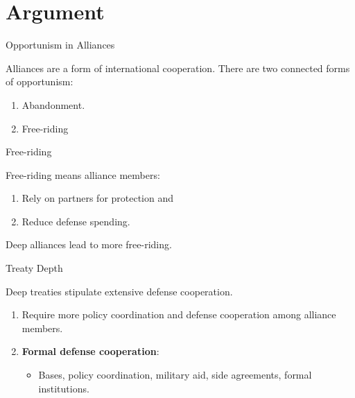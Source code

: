 \documentclass[12pt]{beamer}
\begin{document}

\section{Argument}



\begin{frame}{Opportunism in Alliances}

Alliances are a form of international cooperation. There are two connected forms of opportunism: 
\begin{enumerate} 
\pause
\item Abandonment.   
\pause
\item Free-riding
\end{enumerate}  

\end{frame}


\begin{frame}{Free-riding}

Free-riding means alliance members:

\begin{enumerate} 
\pause
\item Rely on partners for protection and  
\pause
\item Reduce defense spending.
\end{enumerate}  

\end{frame}


\begin{frame}[standout]

Deep alliances lead to more free-riding.   

\end{frame}


\begin{frame}{Treaty Depth}

Deep treaties stipulate extensive defense cooperation. 

\begin{enumerate} 
\pause
\item Require more policy coordination and defense cooperation among alliance members. 
\item \textbf{Formal defense cooperation}:
\pause
\begin{itemize}
\item Bases, policy coordination, military aid, side agreements, formal institutions. 
\end{itemize}  
\end{enumerate}  

\end{frame}
\end{document}

